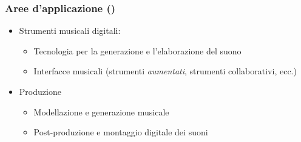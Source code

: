 %
%
% 
% 
% 
%

\setcounter{ms}{0}
\begin{frame}
    \frametitle{Aree d'applicazione ()}

    \begin{itemize}
        \item{Strumenti musicali digitali:}
            \begin{itemize}
                \item{Tecnologia per la generazione e l'elaborazione del suono}
                \item{Interfacce musicali (strumenti \emph{aumentati},
                    strumenti collaborativi, ecc.)}
            \end{itemize}
        \item{Produzione}
            \begin{itemize}
                \item{Modellazione e generazione musicale}
                \item{Post-produzione e montaggio digitale dei suoni}
            \end{itemize}
    \end{itemize}
    
\end{frame}

